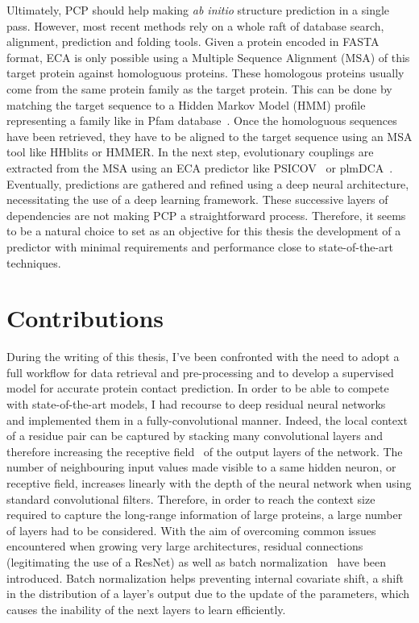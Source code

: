     Ultimately, PCP should help making \textit{ab initio} structure prediction in a single pass.
    However, most recent methods rely on a whole raft of database search, alignment, prediction and folding tools.
    Given a protein encoded in FASTA format, ECA is only possible using a Multiple Sequence Alignment (MSA)
    of this target protein against homologuous proteins.
    These homologous proteins usually come from the same protein family
    as the target protein.
    This can be done by matching the target sequence to a Hidden Markov Model (HMM) profile representing a family
    like in Pfam database~\cite{Pfam}. Once the homologuous sequences have been retrieved, they have to be aligned to
    the target sequence using an MSA tool like HHblits or HMMER. In the next step, evolutionary couplings are extracted from
    the MSA using an ECA predictor like PSICOV~\cite{doi:10.1093/bioinformatics/btr638} or plmDCA~\cite{EKEBERG2014341}.
    Eventually, predictions are gathered and refined using a deep neural architecture, necessitating the use
    of a deep learning framework. These successive layers of dependencies are not making PCP a straightforward process.
    Therefore, it seems to be a natural choice to set as an objective for this thesis the development of a predictor with
    minimal requirements and performance close to state-of-the-art techniques.

\section{Contributions}

    During the writing of this thesis, I've been confronted with the need to
    adopt a full workflow for data retrieval and pre-processing and to develop a supervised
    model for accurate protein contact prediction. In order to be able to compete
    with state-of-the-art models, I had recourse to deep residual
    neural networks~\cite{DBLP:journals/corr/HeZRS15} and implemented them in a
    fully-convolutional manner.
    Indeed, the local context of a residue pair can be captured by stacking many
    convolutional layers and therefore increasing the receptive field~\cite{Hubel1962}
    of the output layers of the network.
    The number of neighbouring input values made visible to a same hidden neuron,
    or receptive field, increases linearly with the depth
    of the neural network when using standard convolutional filters.
    Therefore, in order to reach the context size required to capture the long-range information
    of large proteins, a large number of layers had to be considered.
    With the aim of overcoming common issues
    encountered when growing very large architectures,
    residual connections~\cite{DBLP:journals/corr/HeZRS15}
    (legitimating the use of a ResNet) as well as batch
    normalization~\cite{DBLP:journals/corr/IoffeS15} have been introduced.
    Batch normalization helps preventing internal covariate shift,
    a shift in the distribution of a layer's output due to the update of the parameters,
    which causes the inability of the next layers to learn efficiently.

